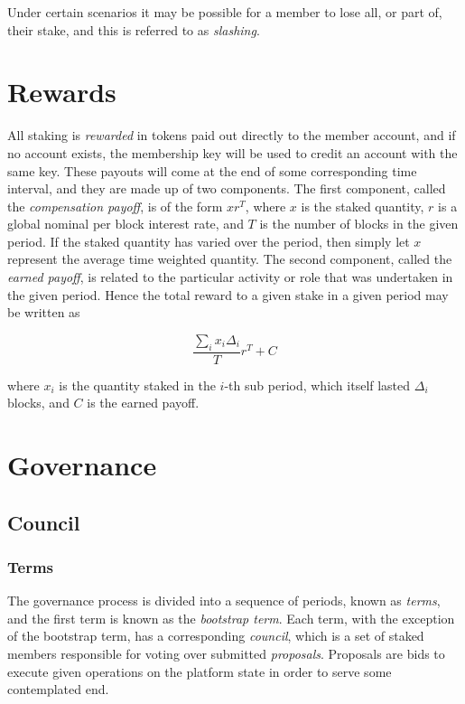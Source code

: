 \documentclass{article}
\begin{document}
Under certain scenarios it may be possible for a member to lose all, or part of, their stake, and this is referred to as \textit{slashing}.

\section{Rewards}

All staking is \textit{rewarded} in tokens paid out directly to the member account, and if no account exists, the membership key will be used to credit an account with the same key. These payouts will come at the end of some corresponding time interval, and they are made up of two components. The first component, called the \textit{compensation payoff}, is of the form $xr^{T}$, where $x$ is the staked quantity, $r$ is a global nominal per block interest rate, and $T$ is the number of blocks in the given period. If the staked quantity has varied over the period, then simply let $x$ represent the average time weighted quantity. The second component, called the \textit{earned payoff}, is related to the particular activity or role that was undertaken in the given period. Hence the total reward to a given stake in a given period may be written as

$$ \frac{\sum_i x_i\Delta_i}{T}r^T + C$$

where $x_i$ is the quantity staked in the $i$-th sub period, which itself lasted $\Delta_i$ blocks, and $C$ is the earned payoff.

\section{Governance}

\subsection{Council}

\subsubsection{Terms}

The governance process is divided into a sequence of periods, known as \textit{terms}, and the first term is known as the \textit{bootstrap term}. Each term, with the exception of the bootstrap term, has a corresponding \textit{council}, which is a set of staked members responsible for voting over submitted \textit{proposals}. Proposals are bids to execute given operations on the platform state in order to serve some contemplated end.
\end{document}
